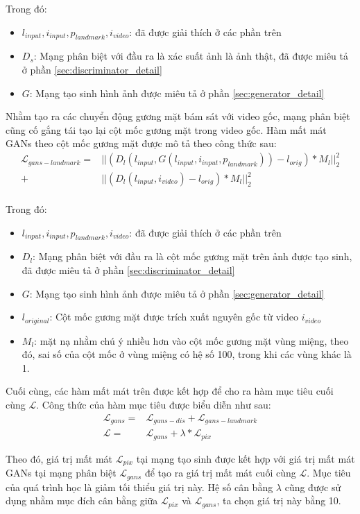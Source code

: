 Trong đó:
\begin{itemize}
    \item \textbf{$l_{input},i_{input},p_{landmark},i_{video}$}: đã được giải thích ở các phần trên
    \item \textbf{$D_s$}: Mạng phân biệt với đầu ra là xác suất ảnh là ảnh thật, đã được miêu tả ở phần \ref{sec:discriminator_detail}
    \item \textbf{$G$}: Mạng tạo sinh hình ảnh được miêu tả ở phần \ref{sec:generator_detail}
\end{itemize}

Nhằm tạo ra các chuyển động gương mặt bám sát với video gốc, mạng phân biệt cũng cố gắng tái tạo lại cột mốc gương mặt trong video gốc. Hàm mất mát GANs theo cột mốc gương mặt được mô tả theo công thức sau:
\begin{equation}
    \begin{split}
    \mathcal{L}_{gans-landmark} = &||(D_l(l_{input},G(l_{input},i_{input},p_{landmark})) - l_{orig})*M_l||^2_2\\
    +&||(D_l(l_{input},i_{video}) - l_{orig})*M_l||^2_2\\
    \end{split}
\end{equation}

Trong đó:
\begin{itemize}
    \item \textbf{$l_{input},i_{input},p_{landmark},i_{video}$}: đã được giải thích ở các phần trên
    \item \textbf{$D_l$}: Mạng phân biệt với đầu ra là cột mốc gương mặt trên ảnh được tạo sinh, đã được miêu tả ở phần \ref{sec:discriminator_detail}
    \item \textbf{$G$}: Mạng tạo sinh hình ảnh được miêu tả ở phần \ref{sec:generator_detail}
    \item \textbf{$l_{original}$}: Cột mốc gương mặt được trích xuất nguyên gốc từ video $i_{video}$
    \item \textbf{$M_l$}: mặt nạ nhằm chú ý nhiều hơn vào cột mốc gương mặt vùng miệng, theo đó, sai số của cột mốc ở vùng miệng có hệ số 100, trong khi các vùng khác là 1.
\end{itemize}

Cuối cùng, các hàm mất mát trên được kết hợp để cho ra hàm mục tiêu cuối cùng $\mathcal{L}$. Công thức của hàm mục tiêu được biểu diễn như sau:
\begin{equation}
    \begin{split}
    \mathcal{L}_{gans} = &\mathcal{L}_{gans-dis} + \mathcal{L}_{gans-landmark}\\
    \mathcal{L} = &\mathcal{L}_{gans} + \lambda*\mathcal{L}_{pix}
    \end{split}
\end{equation}

Theo đó, giá trị mất mát $\mathcal{L}_{pix}$ tại mạng tạo sinh được kết hợp với giá trị mất mát GANs tại mạng phân biệt $\mathcal{L}_{gans}$ để tạo ra giá trị mất mát cuối cùng $\mathcal{L}$. Mục tiêu của quá trình học là giảm tối thiểu giá trị này. Hệ số cân bằng $\lambda$ cũng được sử dụng nhằm mục đích cân bằng giữa $\mathcal{L}_{pix}$ và $\mathcal{L}_{gans}$, ta chọn giá trị này bằng 10.
